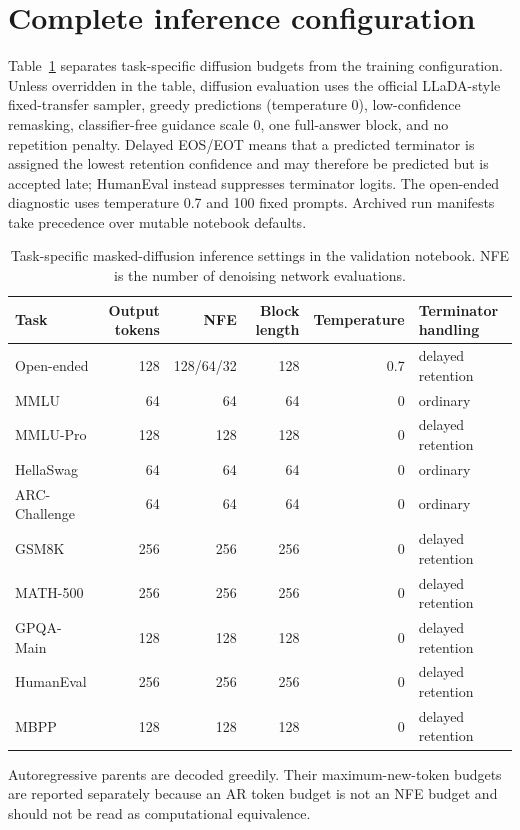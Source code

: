 \documentclass{article}
\begin{document}
\section{Complete inference configuration}
\label{app:inference-settings}

Table~\ref{tab:diffusion-inference} separates task-specific diffusion budgets from the training configuration. Unless overridden in the table, diffusion evaluation uses the official LLaDA-style fixed-transfer sampler, greedy predictions (temperature 0), low-confidence remasking, classifier-free guidance scale 0, one full-answer block, and no repetition penalty. Delayed EOS/EOT means that a predicted terminator is assigned the lowest retention confidence and may therefore be predicted but is accepted late; HumanEval instead suppresses terminator logits. The open-ended diagnostic uses temperature 0.7 and 100 fixed prompts. Archived run manifests take precedence over mutable notebook defaults.

\begin{table}[h]
\caption{Task-specific masked-diffusion inference settings in the validation notebook. NFE is the number of denoising network evaluations.}
\label{tab:diffusion-inference}
\centering
\small
\begin{tabular}{lrrrrl}
\toprule
Task & Output tokens & NFE & Block length & Temperature & Terminator handling \\
\midrule
Open-ended & 128 & 128/64/32 & 128 & 0.7 & delayed retention \\
MMLU & 64 & 64 & 64 & 0 & ordinary \\
MMLU-Pro & 128 & 128 & 128 & 0 & delayed retention \\
HellaSwag & 64 & 64 & 64 & 0 & ordinary \\
ARC-Challenge & 64 & 64 & 64 & 0 & ordinary \\
GSM8K & 256 & 256 & 256 & 0 & delayed retention \\
MATH-500 & 256 & 256 & 256 & 0 & delayed retention \\
GPQA-Main & 128 & 128 & 128 & 0 & delayed retention \\
HumanEval & 256 & 256 & 256 & 0 & delayed retention \\
MBPP & 128 & 128 & 128 & 0 & delayed retention \\
\bottomrule
\end{tabular}
\end{table}

Autoregressive parents are decoded greedily. Their maximum-new-token budgets are reported separately because an AR token budget is not an NFE budget and should not be read as computational equivalence.
\end{document}
